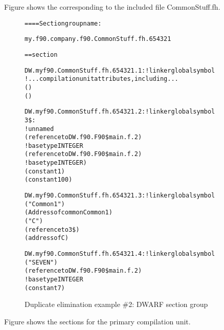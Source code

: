 Figure 
shows the 
corresponding to the included file 
CommonStuff.fh.

\begin{figure}
\begin{dwflisting}
\begin{alltt}
==== Section group name:

    my.f90.company.f90.CommonStuff.fh.654321

== section \dotdebuginfo{}

DW.myf90.CommonStuff.fh.654321.1:    ! linker global symbol
    \DWTAGpartialunit
        ! ...compilation unit attributes, including...
        \DWATlanguage(\DWLANGFortranninety)
        \DWATidentifiercase(\DWIDcaseinsensitive)

DW.myf90.CommonStuff.fh.654321.2:    ! linker global symbol
3\$: \DWTAGarraytype
        ! unnamed
        \DWATtype(reference to DW.f90.F90\$main.f.2)
            ! base type INTEGER
        \DWTAGsubrangetype
            \DWATtype(reference to DW.f90.F90\$main.f.2)
                ! base type INTEGER)
            \DWATlowerbound(constant 1)
            \DWATupperbound(constant 100)

DW.myf90.CommonStuff.fh.654321.3:    ! linker global symbol
    \DWTAGcommonblock
        \DWATname("Common1")
        \DWATlocation(Address of common  Common1)
        \DWTAGvariable
            \DWATname("C")
            \DWATtype(reference to 3\$)
            \DWATlocation(address of C)

DW.myf90.CommonStuff.fh.654321.4:    ! linker global symbol
    \DWTAGconstant
        \DWATname("SEVEN")
        \DWATtype(reference to DW.f90.F90\$main.f.2)
            ! base type INTEGER
        \DWATconstvalue(constant 7)
\end{alltt}
\end{dwflisting}
\caption{Duplicate elimination example \#2: DWARF section group}
\label{fig:duplicateeliminationexample2dwarfsectiongroup}
\end{figure}

Figure 
shows the sections for the primary compilation unit.

